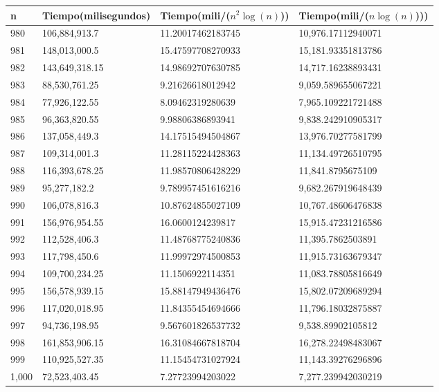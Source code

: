 \begin{table}[H]
\parbox{0.3\textwidth}{
    \begin{tabular}{ | l | l | l | l |}
    \hline
n   &Tiempo(milisegundos) &Tiempo(mili/($n^2 \log(n)$)) &Tiempo(mili/($n \log(n)$)))\\ \hline
980	&106,884,913.7		&11.20017462183745	&10,976.17112940071\\ \hline
981	&148,013,000.5		&15.47597708270933	&15,181.93351813786\\ \hline
982	&143,649,318.15		&14.98692707630785	&14,717.16238893431\\ \hline
983	&88,530,761.25		&9.21626618012942	&9,059.589655067221\\ \hline
984	&77,926,122.55		&8.09462319280639	&7,965.109221721488\\ \hline
985	&96,363,820.55		&9.98806386893941	&9,838.242910905317\\ \hline
986	&137,058,449.3		&14.17515494504867	&13,976.70277581799\\ \hline
987	&109,314,001.3		&11.28115224428363	&11,134.49726510795\\ \hline
988	&116,393,678.25		&11.98570806428229	&11,841.8795675109\\ \hline
989	&95,277,182.2		&9.789957451616216	&9,682.267919648439\\ \hline
990	&106,078,816.3		&10.87624855027109	&10,767.48606476838\\ \hline
991	&156,976,954.55		&16.0600124239817	&15,915.47231216586\\ \hline
992	&112,528,406.3		&11.48768775240836	&11,395.7862503891\\ \hline
993	&117,798,450.6		&11.99972974500853	&11,915.73163679347\\ \hline
994	&109,700,234.25		&11.1506922114351	&11,083.78805816649\\ \hline
995	&156,578,939.15		&15.88147949436476	&15,802.07209689294\\ \hline
996	&117,020,018.95 	&11.84355454694666	&11,796.18032875887\\ \hline
997	&94,736,198.95		&9.567601826537732	&9,538.89902105812\\ \hline
998	&161,853,906.15 	&16.31084667818704	&16,278.22498483067\\ \hline
999	&110,925,527.35		&11.15454731027924	&11,143.39276296896\\ \hline
1,000	&72,523,403.45		&7.27723994203022	&7,277.239942030219\\ \hline
    \end{tabular}
}
\end{table}


